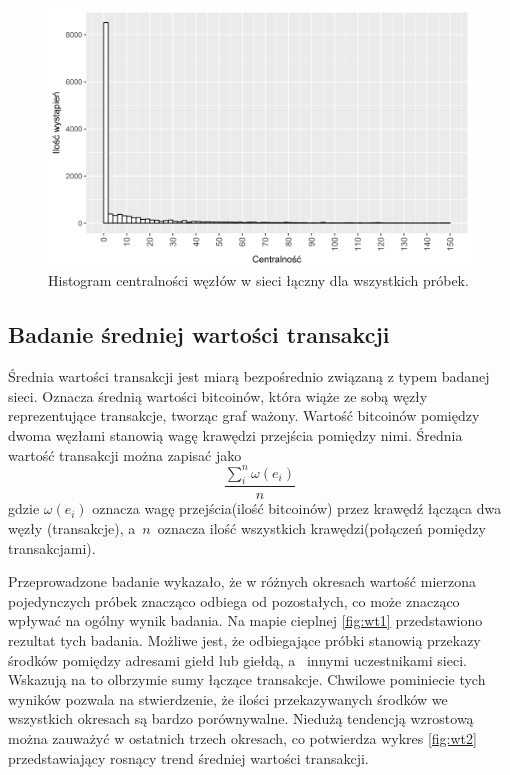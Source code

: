 \documentclass[12pt, twoside, final, openany]{mgr}
\newcommand{\chartsWidth}{0.8}
\begin{document}
\begin{figure}[H]
\centering
   \includegraphics[width=\chartsWidth\linewidth]{pictures/srednia_centralnosc/srednia_centralnosc_hist.png}
   \caption{Histogram centralności węzłów w sieci łączny dla wszystkich próbek.}
   \label{fig:sc3}
\end{figure}

\subsection{Badanie średniej wartości transakcji}
\label{wartosc_transakcji}
\indent Średnia wartości transakcji jest miarą bezpośrednio związaną z typem badanej sieci. Oznacza średnią wartości bitcoinów, która wiąże ze sobą węzły reprezentujące transakcje, tworząc graf ważony. Wartość bitcoinów pomiędzy dwoma węzłami stanowią wagę krawędzi przejścia pomiędzy nimi. Średnia wartość transakcji można zapisać jako
\begin{equation}
\label{eq:wartosc_transakcji}
\frac{\sum_{i}^{n} \omega(e_i)}{n}
\end{equation}
gdzie $\omega(e_i)$ oznacza wagę przejścia(ilość bitcoinów) przez krawędź łącząca dwa węzły (transakcje), a~$n$~oznacza ilość wszystkich krawędzi(połączeń pomiędzy transakcjami). 

\indent Przeprowadzone badanie wykazało, że w różnych okresach wartość mierzona pojedynczych próbek znacząco odbiega od pozostałych, co może znacząco wpływać na ogólny wynik badania.
Na mapie cieplnej \ref{fig:wt1} przedstawiono rezultat tych badania. Możliwe jest, że odbiegające próbki stanowią przekazy środków pomiędzy adresami giełd lub giełdą, a~ innymi uczestnikami sieci. Wskazują na to olbrzymie sumy łączące transakcje. Chwilowe pominiecie tych wyników pozwala na stwierdzenie, że ilości przekazywanych środków we wszystkich okresach są bardzo porównywalne. Niedużą tendencją wzrostową można zauważyć w ostatnich trzech okresach, co potwierdza wykres \ref{fig:wt2} przedstawiający rosnący trend średniej wartości transakcji. 
\end{document}
